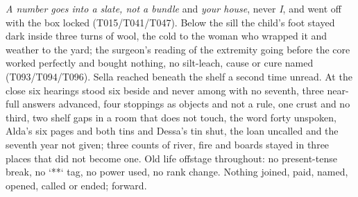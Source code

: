 \documentclass{design/chronicle}
\begin{document}
{\begin{itemize}[leftmargin=1.4em,itemsep=1pt,topsep=3pt,parsep=0pt]
\emph{A number goes into a slate, not a bundle} and \emph{your house}, never \emph{I}, and went off with the box locked (T015/T041/T047). Below the sill the child’s foot stayed dark inside three turns of wool, the cold to the woman who wrapped it and weather to the yard; the surgeon’s reading of the extremity going before the core worked perfectly and bought nothing, no silt-leach, cause or cure named (T093/T094/T096). Sella reached beneath the shelf a second time unread. At the close six hearings stood six beside and never among with no seventh, three near-full answers advanced, four stoppings as objects and not a rule, one crust and no third, two shelf gaps in a room that does not touch, the word forty unspoken, Alda’s six pages and both tins and Dessa’s tin shut, the loan uncalled and the seventh year not given; three counts of river, fire and boards stayed in three places that did not become one. Old life offstage throughout: no present-tense break, no `**` tag, no power used, no rank change. Nothing joined, paid, named, opened, called or ended; forward.

\end{itemize}

\begin{itemize}[leftmargin=1.4em,itemsep=1pt,topsep=3pt,parsep=0pt]


\end{itemize}}
\end{document}

